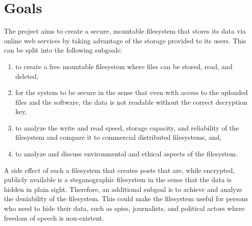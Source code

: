 
\section{Goals}


The project aims to create a secure, mountable filesystem that stores its data via online web services by taking advantage of the storage provided to its users. This can be split into the following subgoals:
\begin{enumerate}
\item to create a free mountable filesystem where files can be stored, read, and deleted,
\item for the system to be secure in the sense that even with access to the uploaded files and the software, the data is not readable without the correct decryption key, 
\item to analyze the write and read speed, storage capacity, and reliability of the filesystem and compare it to commercial distributed filesystems, and,
\item to analyze and discuss environmental and ethical aspects of the filesystem.
\end{enumerate}

A side effect of such a filesystem that creates posts that are, while encrypted, publicly available is a steganographic filesystem in the sense that the data is hidden in plain sight. Therefore, an additional subgoal is to achieve and analyze the deniability of the filesystem. This could make the filesystem useful for persons who need to hide their data, such as spies, journalists, and political actors where freedom of speech is non-existent.

